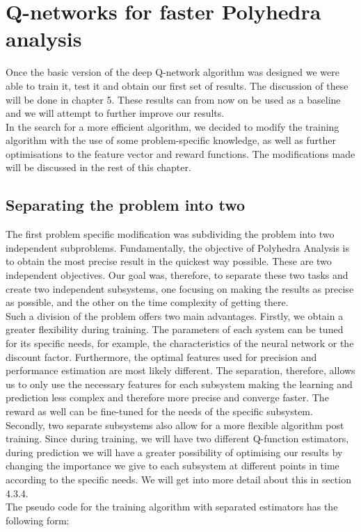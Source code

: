 \section{Q-networks for faster Polyhedra analysis}
Once the basic version of the deep Q-network algorithm was designed we were able to train it, test it and obtain our first set of results. The discussion of these will be done in chapter 5. These results can from now on be used as a baseline and we will attempt to further improve our results.\\
In the search for a more efficient algorithm, we decided to modify the training algorithm with the use of some problem-specific knowledge, as well as further optimisations to the feature vector and reward functions. The modifications made will be discussed in the rest of this chapter.


\subsection{Separating the problem into two}
The first problem specific modification was subdividing the problem into two independent subproblems. Fundamentally, the objective of Polyhedra Analysis is to obtain the most precise result in the quickest way possible. These are two independent objectives. Our goal was, therefore, to separate these two tasks and create two independent subsystems, one focusing on making the results as precise as possible, and the other on the time complexity of getting there.\\
 Such a division of the problem offers two main advantages. Firstly, we obtain a greater flexibility during training. The parameters of each system can be tuned for its specific needs, for example, the characteristics of the neural network or the discount factor. Furthermore, the optimal features used for precision and performance estimation are most likely different. The separation, therefore, allows us to only use the necessary features for each subsystem making the learning and prediction less complex and therefore more precise and converge faster. The reward as well can be fine-tuned for the needs of the specific subsystem.\\ 
 Secondly, two separate subsystems also allow for a more flexible algorithm post training. Since during training, we will have two different Q-function estimators, during prediction we will have a greater possibility of optimising our results by changing the importance we give to each subsystem at different points in time according to the specific needs. We will get into more detail about this in section 4.3.4.\\
 The pseudo code for the training algorithm with separated estimators has the following form:


